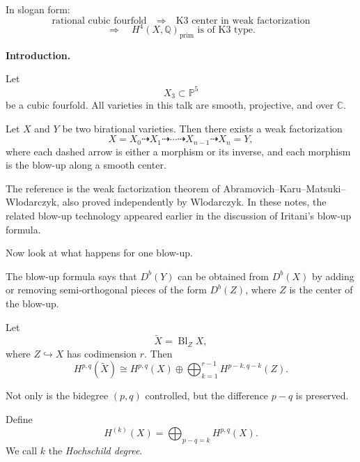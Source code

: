In slogan form:
\[
\text{rational cubic fourfold}
\quad\Longrightarrow\quad
\text{K3 center in weak factorization}
\]
\[
\Longrightarrow
\quad
H^4(X,\mathbb{Q})_{\mathrm{prim}}
\text{ is of K3 type.}
\]

\medskip\noindent
{\bf Introduction.}

Let
\[
X_3\subset \mathbb{P}^5
\]
be a cubic fourfold.
All varieties in this talk are
smooth, projective, and over
$\mathbb{C}$.

\begin{theorem}
\label{theorem-let-x6}
Let $X$ and $Y$ be two birational
varieties.
Then there exists a weak
factorization
\[
X=X_0\dashrightarrow X_1
\dashrightarrow \cdots
\dashrightarrow X_{n-1}
\dashrightarrow X_n=Y,
\]
where each dashed arrow is either a
morphism or its inverse, and each
morphism is the blow-up along a smooth
center.
\end{theorem}

\begin{remark}
\label{remark-reference-weak}
The reference is the weak
factorization theorem of
Abramovich--Karu--Matsuki--Wlodarczyk,
also proved independently by
Wlodarczyk.
In these notes, the related blow-up
technology appeared earlier in the
discussion of Iritani's blow-up
formula.
\end{remark}

Now look at what happens for one
blow-up.

The blow-up formula says that
$D^b(Y)$ can be obtained from
$D^b(X)$ by adding or removing
semi-orthogonal pieces of the form
$D^b(Z)$, where $Z$ is the center of
the blow-up.

\begin{theorem}
\label{theorem-blow-up}
Let
\[
\widetilde X=\operatorname{Bl}_Z X,
\]
where $Z\hookrightarrow X$ has
codimension $r$.
Then
\[
H^{p,q}(\widetilde X)
\cong
H^{p,q}(X)
\oplus
\bigoplus_{k=1}^{r-1}
H^{p-k,q-k}(Z).
\]
\end{theorem}

\begin{remark}
\label{remark-not-only}
Not only is the bidegree $(p,q)$
controlled, but the difference
$p-q$ is preserved.
\end{remark}

\begin{definition}
\label{definition-define-h}
Define
\[
H^{(k)}(X)
=
\bigoplus_{p-q=k} H^{p,q}(X).
\]
We call $k$ the {\it Hochschild
degree}.
\end{definition}

